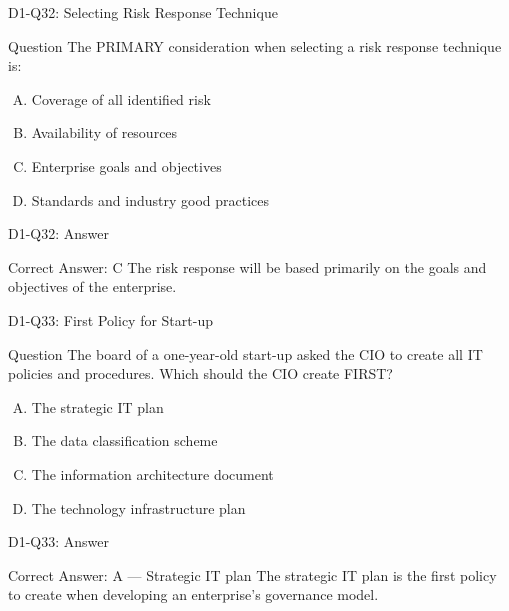 \documentclass{beamer}
\begin{document}
	\begin{frame}{D1-Q32: Selecting Risk Response Technique}
		\begin{block}{Question}
			The PRIMARY consideration when selecting a risk response technique is:
		\end{block}
		\begin{enumerate}[(A)]
			\item Coverage of all identified risk
			\item Availability of resources
			\item Enterprise goals and objectives
			\item Standards and industry good practices
		\end{enumerate}
	\end{frame}
	\begin{frame}{D1-Q32: Answer}
		\begin{block}{Correct Answer: C}
			The risk response will be based primarily on the goals and objectives of the enterprise.
		\end{block}
	\end{frame}
	
	\begin{frame}{D1-Q33: First Policy for Start-up}
		\begin{block}{Question}
			The board of a one-year-old start-up asked the CIO to create all IT policies and procedures. Which should the CIO create FIRST?
		\end{block}
		\begin{enumerate}[(A)]
			\item The strategic IT plan
			\item The data classification scheme
			\item The information architecture document
			\item The technology infrastructure plan
		\end{enumerate}
	\end{frame}
	\begin{frame}{D1-Q33: Answer}
		\begin{block}{Correct Answer: A --- Strategic IT plan}
			The strategic IT plan is the first policy to create when developing an enterprise's governance model.
		\end{block}
	\end{frame}
	
\end{document}
